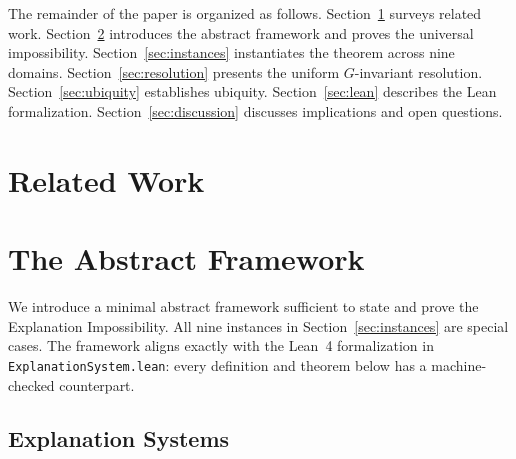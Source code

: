\documentclass[twoside]{jmlr}
\begin{document}
The remainder of the paper is organized as follows.
Section~\ref{sec:related} surveys related work.
Section~\ref{sec:framework} introduces the abstract framework and proves
the universal impossibility.  Section~\ref{sec:instances} instantiates the
theorem across nine domains.  Section~\ref{sec:resolution} presents the
uniform $G$-invariant resolution.  Section~\ref{sec:ubiquity} establishes
ubiquity.  Section~\ref{sec:lean} describes the Lean formalization.
Section~\ref{sec:discussion} discusses implications and open questions.

\section{Related Work}
\label{sec:related}



\section{The Abstract Framework}
\label{sec:framework}

We introduce a minimal abstract framework sufficient to state and prove the
Explanation Impossibility.  All nine instances in
Section~\ref{sec:instances} are special cases.
The framework aligns exactly with the Lean~4 formalization in
\texttt{ExplanationSystem.lean}: every definition and theorem below has a
machine-checked counterpart.

\subsection{Explanation Systems}
\end{document}
